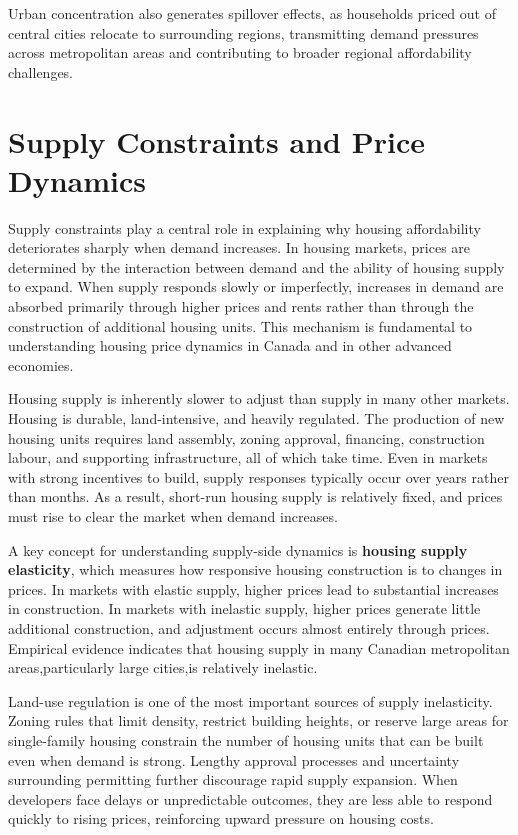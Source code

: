 \documentclass[11pt]{article}
\begin{document}
Urban concentration also generates spillover effects, as households priced out of central cities relocate to surrounding regions, transmitting demand pressures across metropolitan areas and contributing to broader regional affordability challenges.






\section{Supply Constraints and Price Dynamics}

Supply constraints play a central role in explaining why housing affordability deteriorates sharply when demand increases. In housing markets, prices are determined by the interaction between demand and the ability of housing supply to expand. When supply responds slowly or imperfectly, increases in demand are absorbed primarily through higher prices and rents rather than through the construction of additional housing units. This mechanism is fundamental to understanding housing price dynamics in Canada and in other advanced economies.

Housing supply is inherently slower to adjust than supply in many other markets. Housing is durable, land-intensive, and heavily regulated. The production of new housing units requires land assembly, zoning approval, financing, construction labour, and supporting infrastructure, all of which take time. Even in markets with strong incentives to build, supply responses typically occur over years rather than months. As a result, short-run housing supply is relatively fixed, and prices must rise to clear the market when demand increases.

A key concept for understanding supply-side dynamics is \textbf{housing supply elasticity}, which measures how responsive housing construction is to changes in prices. In markets with elastic supply, higher prices lead to substantial increases in construction. In markets with inelastic supply, higher prices generate little additional construction, and adjustment occurs almost entirely through prices. Empirical evidence indicates that housing supply in many Canadian metropolitan areas,particularly large cities,is relatively inelastic.

Land-use regulation is one of the most important sources of supply inelasticity. Zoning rules that limit density, restrict building heights, or reserve large areas for single-family housing constrain the number of housing units that can be built even when demand is strong. Lengthy approval processes and uncertainty surrounding permitting further discourage rapid supply expansion. When developers face delays or unpredictable outcomes, they are less able to respond quickly to rising prices, reinforcing upward pressure on housing costs.
\end{document}
